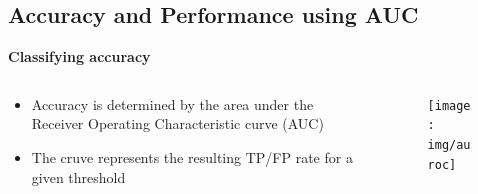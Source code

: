 \documentclass[t, xcolor={dvipsnames}]{beamer}
\begin{document}
\subsection{Accuracy and Performance using AUC}
\begin{frame}[fragile]
  \vspace{0.5cm}
  {\bfseries\Large Classifying accuracy}
  \vspace{0.5cm}
  \begin{columns}[T]
    \begin{column}{0.5\textwidth}
    \begin{itemize}
      \item Accuracy is determined by the area under the Receiver Operating Characteristic curve (AUC)
      \item The cruve represents the resulting TP/FP rate for a given threshold
    \end{itemize}
  \end{column}
  \begin{column}{0.5\textwidth}
    \vspace{-1cm}
    \begin{figure}
      \texttt{[image: img/auroc]}
    \end{figure}
  \end{column}
  \end{columns}
\end{frame}



\end{document}
